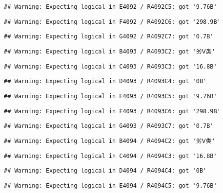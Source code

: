 \documentclass[
]{article}
\begin{document}
\begin{verbatim}
## Warning: Expecting logical in E4092 / R4092C5: got '9.76B'
\end{verbatim}

\begin{verbatim}
## Warning: Expecting logical in F4092 / R4092C6: got '298.9B'
\end{verbatim}

\begin{verbatim}
## Warning: Expecting logical in G4092 / R4092C7: got '0.7B'
\end{verbatim}

\begin{verbatim}
## Warning: Expecting logical in B4093 / R4093C2: got '劣Ⅴ类'
\end{verbatim}

\begin{verbatim}
## Warning: Expecting logical in C4093 / R4093C3: got '16.8B'
\end{verbatim}

\begin{verbatim}
## Warning: Expecting logical in D4093 / R4093C4: got '0B'
\end{verbatim}

\begin{verbatim}
## Warning: Expecting logical in E4093 / R4093C5: got '9.76B'
\end{verbatim}

\begin{verbatim}
## Warning: Expecting logical in F4093 / R4093C6: got '298.9B'
\end{verbatim}

\begin{verbatim}
## Warning: Expecting logical in G4093 / R4093C7: got '0.7B'
\end{verbatim}

\begin{verbatim}
## Warning: Expecting logical in B4094 / R4094C2: got '劣Ⅴ类'
\end{verbatim}

\begin{verbatim}
## Warning: Expecting logical in C4094 / R4094C3: got '16.8B'
\end{verbatim}

\begin{verbatim}
## Warning: Expecting logical in D4094 / R4094C4: got '0B'
\end{verbatim}

\begin{verbatim}
## Warning: Expecting logical in E4094 / R4094C5: got '9.76B'
\end{verbatim}
\end{document}
